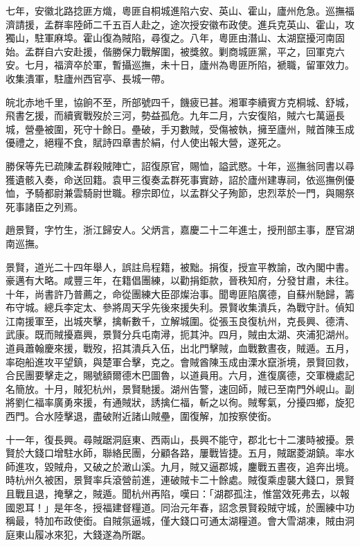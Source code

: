 \begin{pinyinscope}
七年，安徽北路捻匪方熾，粵匪自桐城進陷六安、英山、霍山，廬州危急。巡撫福濟請援，孟群率陸師二千五百人赴之，途次授安徽布政使。進兵克英山、霍山，攻獨山，駐軍麻埠。霍山復為賊陷，尋復之。八年，粵匪由潛山、太湖竄擾河南固始。孟群自六安赴援，偕勝保力戰解圍，被獎敘。剿商城匪黨，平之，回軍克六安。七月，福濟卒於軍，暫攝巡撫，未十日，廬州為粵匪所陷，褫職，留軍效力。收集潰軍，駐廬州西官亭、長城一帶。

皖北赤地千里，協餉不至，所部號四千，饑疲已甚。湘軍李續賓方克桐城、舒城，飛書乞援，而續賓戰歿於三河，勢益孤危。九年二月，六安復陷，賊六七萬逼長城，營壘被圍，死守十餘日。壘破，手刃數賊，受傷被執，擁至廬州，賊首陳玉成優禮之，絕糧不食，賦詩四章書於絹，付人使出報大營，遂死之。

勝保等先已疏陳孟群殺賊陣亡，詔復原官，賜恤，謚武愍。十年，巡撫翁同書以尋獲遺骸入奏，命送回籍。袁甲三復奏孟群死事實跡，詔於廬州建專祠，依巡撫例優恤，予騎都尉兼雲騎尉世職。穆宗即位，以孟群父子殉節，忠烈萃於一門，與賜祭死事諸臣之列焉。

趙景賢，字竹生，浙江歸安人。父炳言，嘉慶二十二年進士，授刑部主事，歷官湖南巡撫。

景賢，道光二十四年舉人，誤註烏程籍，被黜。捐復，授宣平教諭，改內閣中書。豪邁有大略。咸豐三年，在籍倡團練，以勸捐鉅款，晉秩知府，分發甘肅，未往。十年，尚書許乃普薦之，命從團練大臣邵燦治事。聞粵匪陷廣德，自蘇州馳歸，籌布守城。總兵李定太、參將周天孚先後來援失利。景賢收集潰兵，為戰守計。偵知江南援軍至，出城夾擊，擒斬數千，立解城圍。從張玉良復杭州，克長興、德清、武康。既而賊擾嘉興，景賢分兵屯南潯，扼其沖。四月，賊由太湖、夾浦犯湖州。道員蕭翰慶來援，戰歿，招其潰兵入伍，出北門擊賊，血戰數晝夜，賊遁。五月，率砲船進攻平望鎮，與楚軍合擊，克之。會賊酋陳玉成由溧水竄浙境，景賢回救，合民團要擊走之，賜號額爾德木巴圖魯，以道員用。六月，進復廣德，交軍機處記名簡放。十月，賊犯杭州，景賢馳援。湖州告警，速回師，賊已至南門外峴山。副將劉仁福率廣勇來援，有通賊狀，誘擒仁福，斬之以徇。賊奪氣，分擾四鄉，旋犯西門。合水陸擊退，盡破附近諸山賊壘，圍復解，加按察使銜。

十一年，復長興。尋賊踞洞庭東、西兩山，長興不能守，郡北七十二漊時被擾。景賢於大錢口增駐水師，聯絡民團，分顧各路，屢戰皆捷。五月，賊踞菱湖鎮。率水師進攻，毀賊舟，又破之於澉山溪。九月，賊又逼郡城，鏖戰五晝夜，追奔出境。時杭州久被困，景賢率兵滾營前進，連破賊卡二十餘處。賊復乘虛襲大錢口，景賢且戰且退，掩擊之，賊遁。聞杭州再陷，嘆曰：「湖郡孤注，惟當效死弗去，以報國恩耳！」是年冬，授福建督糧道。同治元年春，詔念景賢殺賊守城，於團練中功稱最，特加布政使銜。自賊氛逼城，僅大錢口可通太湖糧道。會大雪湖凍，賊由洞庭東山履冰來犯，大錢遂為所踞。


\end{pinyinscope}
